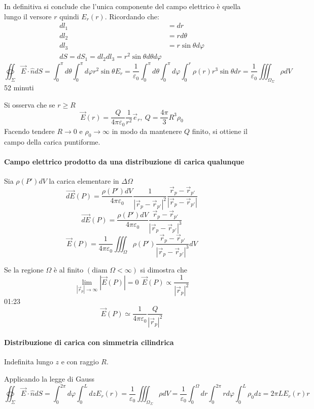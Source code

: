 In definitiva si conclude che l'unica componente del campo elettrico è quella lungo 
il versore $r$ quindi $E_r(r)$.
Ricordando che:
\begin{align*}
dl_1 &= dr \\
dl_2 &= rd\theta \\
dl_3 &= r\sin\theta d\varphi \\
dS = dS_1 = dl_2dl_3 = r^2\sin\theta d\theta d \varphi
\end{align*}
$$
\oiint_\Sigma\vec{E}\cdot\hat{n}dS = \int_0^\pi d\theta \int_0^\pi d\varphi r^2 \sin\theta E_r = 
\frac{1}{\varepsilon_0} \int_0^\pi d\theta \int_0^\pi d\varphi \int_0^r \rho(r) r^3\sin\theta dr =\frac{1}{\varepsilon_0}\iiint_{\Omega_\Sigma} \rho d V
$$
52 minuti


Si osserva che se $r\geq R$ 
$$
\vec{E}(r) = \frac{Q}{4\pi\varepsilon_0} \frac{1}{r^2} \vec{e}_r,\ Q = \frac{4\pi }{3}R^3\rho_0
$$
Facendo tendere $R\to 0 $ e $\rho_0 \to \infty$ in modo da mantenere $Q$ finito, si ottiene
il campo della carica puntiforme.

\paragraph{Campo elettrico prodotto da una distribuzione di carica qualunque}
Sia $\rho(P')dV$ la carica elementare in $\Delta\Omega$
$$
\vec{dE}(P) = \frac{\rho(P')dV}{4\pi\varepsilon_0}\frac{1}{|\vec{r}_p-\vec{r}_{p'}|^2} \frac{\vec{r}_p-\vec{r}_{p'}}{|\vec{r}_p-\vec{r}_{p'}|}
$$
$$
\vec{dE}(P) = \frac{\rho(P')dV}{4\pi \varepsilon_0} \frac{\vec{r}_p-\vec{r}_{p'}}{|\vec{r}_p-\vec{r}_{p'}|^3}
$$
$$
\vec{E}(P) = \frac{1}{4\pi\varepsilon_0} \iiint_\Omega \rho(P')  \frac{\vec{r}_p-\vec{r}_{p'}}{|\vec{r}_p-\vec{r}_{p'}|^3} dV
$$

Se la regione $\Omega$ è al finito $(\text{diam }\Omega<\infty)$ si dimostra che 
$$
\lim_{|\vec{r}_p| \to \infty} |\vec{E}(P)| = 0\ \ \vec{E}(P) \propto \frac{1}{|\vec{r}_p|^2}
$$
01:23
$$
\vec{E}(P) \simeq \frac{1}{4\pi\varepsilon_0} \frac{Q}{|\vec{r}_p|^2}
$$
\newpage
\paragraph{Distribuzione di carica con simmetria cilindrica}
Indefinita lungo $z$ e con raggio $R$.


Applicando la legge di Gauss
$$
\oiint_\Sigma\vec{E}\cdot\hat{n}dS = \int_0^{2\pi}d\varphi \int_0^L dz E_r(r) = \frac{1}{\varepsilon_0}
\iiint_{\Omega_\Sigma}\rho dV = \frac{1}{\varepsilon_0} \int_{0}^{\Omega}dr\int_{0}^{2\pi} rd\varphi\int_0^L \rho_0 dz = 2\pi L E_r(r) r
$$

